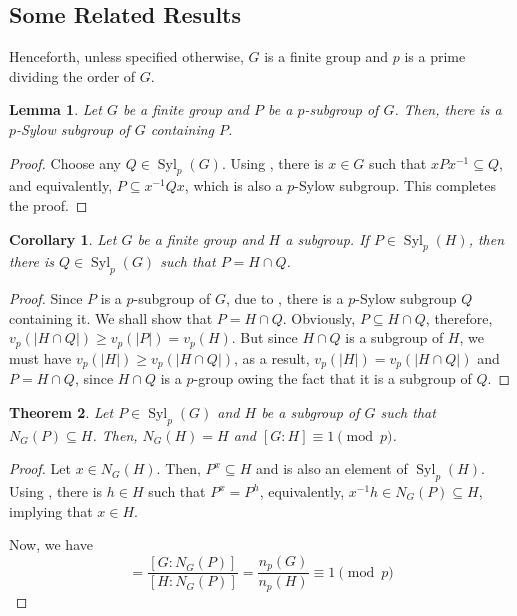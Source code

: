 \documentclass[12pt]{article}
\theoremstyle{thmstyle}
\newtheorem{theorem}{Theorem}[section]
\newtheorem{lemma}[theorem]{Lemma}
\theoremstyle{defstyle}
\newtheorem*{corollary}{Corollary}
\renewcommand{\ge}{\geqslant}
\newcommand{\Syl}{\operatorname{Syl}}
\begin{document}
\subsection{Some Related Results}

Henceforth, unless specified otherwise, $G$ is a finite group and $p$ is a prime dividing the order of $G$.

\begin{lemma}
    Let $G$ be a finite group and $P$ be a $p$-subgroup of $G$. Then, there is a $p$-Sylow subgroup of $G$ containing $P$.
\end{lemma}
\begin{proof}
    Choose any $Q\in\Syl_p(G)$. Using , there is $x\in G$ such that $xPx^{-1}\subseteq Q$, and equivalently, $P\subseteq x^{-1}Qx$, which is also a $p$-Sylow subgroup. This completes the proof.
\end{proof}

\begin{corollary}
    Let $G$ be a finite group and $H$ a subgroup. If $P\in\Syl_p(H)$, then there is $Q\in\Syl_p(G)$ such that $P = H\cap Q$.
\end{corollary}
\begin{proof}
    Since $P$ is a $p$-subgroup of $G$, due to , there is a $p$-Sylow subgroup $Q$ containing it. We shall show that $P = H\cap Q$. Obviously, $P\subseteq H\cap Q$, therefore, $v_p(|H\cap Q|)\ge v_p(|P|) = v_p(H)$. But since $H\cap Q$ is a subgroup of $H$, we must have $v_p(|H|)\ge v_p(|H\cap Q|)$, as a result, $v_p(|H|) = v_p(|H\cap Q|)$ and $P = H\cap Q$, since $H\cap Q$ is a $p$-group owing the fact that it is a subgroup of $Q$.
\end{proof}


\begin{theorem}
    Let $P\in\Syl_p(G)$ and $H$ be a subgroup of $G$ such that $N_G(P)\subseteq H$. Then, $N_G(H) = H$ and $[G:H]\equiv 1\pmod p$.
\end{theorem}
\begin{proof}
    Let $x\in N_G(H)$. Then, $P^x\subseteq H$ and is also an element of $\Syl_p(H)$. Using , there is $h\in H$ such that $P^x = P^h$, equivalently, $x^{-1}h\in N_G(P)\subseteq H$, implying that $x\in H$.

    Now, we have 
    \begin{equation*}
        [G:H] = \frac{[G:N_G(P)]}{[H:N_G(P)]} = \frac{n_p(G)}{n_p(H)}\equiv1\pmod p
    \end{equation*}
\end{proof}
\end{document}
